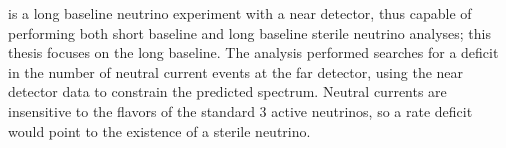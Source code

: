 \nova is a long baseline neutrino experiment with a near detector, thus capable of performing both short baseline and long baseline sterile neutrino analyses; this thesis focuses on the long baseline. The analysis performed searches for a deficit in the number of neutral current events at the far detector, using the near detector data to constrain the predicted spectrum. Neutral currents are insensitive to the flavors of the standard 3 active neutrinos, so a rate deficit would point to the existence of a sterile neutrino.  




